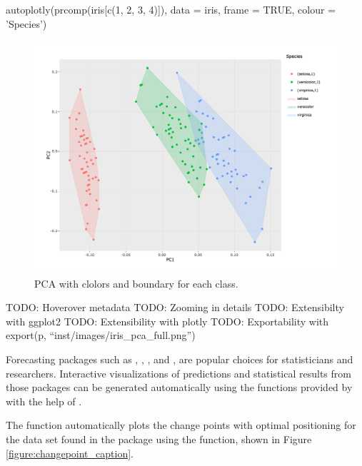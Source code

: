 \begin{Schunk}
\begin{Sinput}
autoplotly(prcomp(iris[c(1, 2, 3, 4)]), data = iris, frame = TRUE, colour = 'Species')
\end{Sinput}
\end{Schunk}

\begin{figure}[htbp]
  \centering
  \includegraphics[width=145mm,scale=0.8]{images/iris_pca_full.png}
  \caption{PCA with clolors and boundary for each class.}
  \label{figure:pca_full}
\end{figure}

TODO: Hoverover metadata TODO: Zooming in details TODO: Extensibilty
with ggplot2 TODO: Extensibility with plotly TODO: Exportability with
export(p, ``inst/images/iris\_pca\_full.png'')

Forecasting packages such as  \citep{forecast},
 \citep{changepoint}, 
\citep{strucchange}, and  \citep{dlm}, are popular choices
for statisticians and researchers. Interactive visualizations of
predictions and statistical results from those packages can be generated
automatically using the functions provided by  with the
help of .

The  function automatically plots the change points with
optimal positioning for the  data set found in the
 package using the  function, shown
in Figure \ref{figure:changepoint_caption}.

